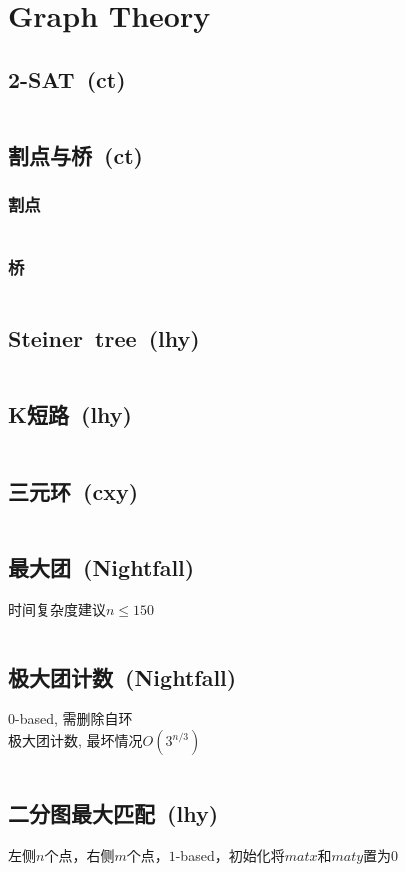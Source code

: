 \chapter{Graph Theory}
\section{2-SAT\ \small(ct)}
	\inputminted{cpp}{graph_theory/2_sat.cpp}
\section{割点与桥\ \small(ct)}
	\subsection*{割点}
		\inputminted{cpp}{graph_theory/cut_point.cpp}
	\subsection*{桥}
		\inputminted{cpp}{graph_theory/bridge.cpp}
\section{Steiner\ tree\ \small(lhy)}
	\inputminted{cpp}{graph_theory/steiner_tree.cpp}
\section{K短路\ \small(lhy)}
	\inputminted{cpp}{graph_theory/kth_minimum_path.cpp}
\section{三元环\ \small(cxy)}
    \inputminted{cpp}{graph_theory/ternary_ring.cpp}
\section{最大团\ \small(Nightfall)}
	时间复杂度建议$ n \leq 150 $
	\inputminted{cpp}{graph_theory/maximum_clique.cpp}
\section{极大团计数\ \small(Nightfall)}
	$ 0 $-based, 需删除自环
	\\极大团计数, 最坏情况$ O(3^{n / 3}) $
	\inputminted{cpp}{graph_theory/maximum_clique_count.cpp}
\section{二分图最大匹配\ \small(lhy)}
	左侧$ n $个点，右侧$ m $个点，$ 1 $-based，初始化将$ matx $和$ maty $置为$ 0 $
	\inputminted{cpp}{graph_theory/hopcroft_karp.cpp}
